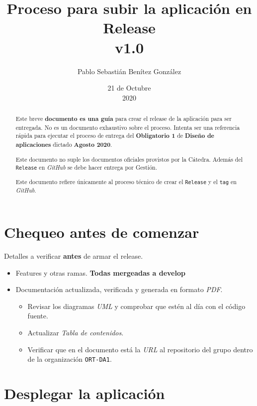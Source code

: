 \documentclass[12pt,a4paper]{article}
\title{Proceso para subir la aplicación en Release\\v1.0}
\author{Pablo Sebastián Benítez González}
\date{21 de Octubre\\2020}
\begin{document}
\maketitle

\tableofcontents

\clearpage

\begin{abstract}
Este breve \textbf{documento es una guía} para crear el release de la aplicación para ser entregada. No es un documento exhaustivo sobre el proceso. Intenta ser una referencia rápida para ejecutar el proceso de entrega del \textbf{Obligatorio 1} de \textbf{Diseño de aplicaciones} dictado \textbf{Agosto 2020}.

Este documento no suple los documentos oficiales provistos por la Cátedra. Además del \texttt{Release} en \textit{GitHub} se debe hacer entrega por Gestión.

Este documento refiere únicamente al proceso técnico de crear el \texttt{Release} y el \texttt{tag} en \textit{GitHub}.
\end{abstract}

\section{Chequeo antes de comenzar}

Detalles a verificar \textbf{antes} de armar el release.

\begin{itemize}
	\item Features y otras ramas. \textbf{Todas mergeadas a develop}
	\item Documentación actualizada, verificada y generada en formato \textit{PDF}.
	\begin{itemize}
		\item Revisar los diagramas \textit{UML} y comprobar que estén al día con el código fuente.
		\item Actualizar \textit{Tabla de contenidos}.
		\item Verificar que en el documento está la \textit{URL} al repositorio del grupo dentro de la organización \texttt{ORT-DA1}.
	\end{itemize}
\end{itemize}

\section{Desplegar la aplicación}
\end{document}
